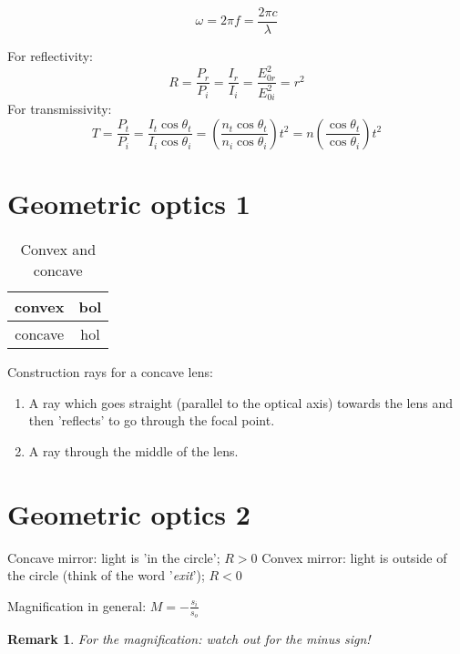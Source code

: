 \documentclass{article}
\newtheorem*{remark}{Remark}
\begin{document}
$$\omega=2\pi f=\frac{2\pi c}{\lambda}$$

\noindent
For reflectivity:
\begin{equation}
    R=\frac{P_r}{P_i}=\frac{I_r}{I_i}=\frac{E_{0r}^2}{E_{0i}^2}=r^2
\end{equation}
For transmissivity:
\begin{equation}
    T=\frac{P_t}{P_i}=\frac{I_t \cos{\theta_t}}{I_i \cos{\theta_i}}=\left(\frac{n_t\cos{\theta_t}}{n_i\cos{\theta_i}}\right)t^2=n\left(\frac{\cos{\theta_t}}{\cos{\theta_i}}\right)t^2
\end{equation}

\section{Geometric optics 1}

\begin{table}[H]
    \centering
    \begin{tabular}{c|c}
         convex & bol \\ \hline
         concave & hol
    \end{tabular}
    \caption{Convex and concave}
    \label{tab:my_label}
\end{table}

Construction rays for a concave lens:
\begin{enumerate}
    \item A ray which goes straight (parallel to the optical axis) towards the lens and then 'reflects' to go through the focal point.
    \item A ray through the middle of the lens.
\end{enumerate}

\section{Geometric optics 2}
Concave mirror: light is 'in the circle'; $R>0$\newline
Convex mirror: light is outside of the circle (think of the word '\emph{exit}'); $R<0$

\noindent{}Magnification in general: $M=-\frac{s_i}{s_o}$
\begin{remark}
For the magnification: watch out for the minus sign!
\end{remark}
\end{document}
